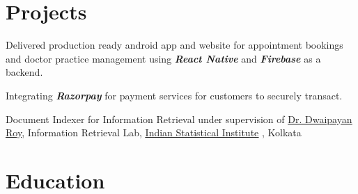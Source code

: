 \documentclass[]{deedy-resume-reversed}
\begin{document}
\newpage
\begin{multicols}{2}
\justifying


\needspace{8cm}
\section{Projects}

\needspace{2.5cm}
\vspace{\topsep} %

\begin{tightemize}
\item Delivered production ready android app and website for appointment bookings and doctor practice management using \textbf{\textit{React Native}} and \textbf{\textit{Firebase}} as a backend.
\item Integrating \textbf{\textit{Razorpay}} for payment services for customers to securely transact.
\end{tightemize}
\sectionsep

\needspace{2cm}
\begin{tightemize}
\item Document Indexer for Information Retrieval under supervision of \href{https://dwaipayanroy.github.io/}{\underline{Dr. Dwaipayan Roy}}, Information Retrieval Lab, \href{https://en.wikipedia.org/wiki/Indian_Statistical_Institute}{\underline{Indian Statistical Institute}} , Kolkata
\end{tightemize}
\sectionsep


\needspace{2cm}
\section{Education}

\needspace{2cm}
\vspace{\topsep} %


\end{multicols}
\end{document}
